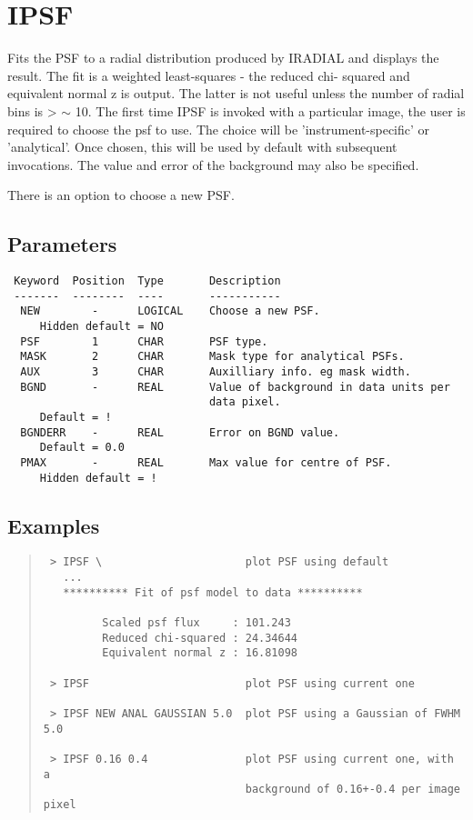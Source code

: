 \documentclass{book}
\renewcommand{\_}{{\tt\char'137}}     %
\begin{document}
\section{IPSF}
Fits the PSF to a radial distribution produced by IRADIAL and displays
the result. The fit is a weighted least-squares - the reduced chi-
squared and equivalent normal z is output. The latter is not useful
unless the number of radial bins is > $\sim$ 10. The first time IPSF is
invoked with a particular image, the user is required to choose the
psf to use. The choice will be 'instrument-specific' or 'analytical'.
Once chosen, this will be used by default with subsequent invocations.
The value and error of the background may also be specified.

There is an option to choose a new PSF.

\subsection{Parameters}
\begin{verbatim}
 Keyword  Position  Type       Description
 -------  --------  ----       -----------
  NEW        -      LOGICAL    Choose a new PSF.
     Hidden default = NO
  PSF        1      CHAR       PSF type.
  MASK       2      CHAR       Mask type for analytical PSFs.
  AUX        3      CHAR       Auxilliary info. eg mask width.
  BGND       -      REAL       Value of background in data units per
                               data pixel.
     Default = !
  BGNDERR    -      REAL       Error on BGND value.
     Default = 0.0
  PMAX       -      REAL       Max value for centre of PSF.
     Hidden default = !
\end{verbatim}\subsection{Examples}
\begin{quote}\begin{verbatim}
 > IPSF \                      plot PSF using default
   ...
   ********** Fit of psf model to data **********

         Scaled psf flux     : 101.243
         Reduced chi-squared : 24.34644
         Equivalent normal z : 16.81098

 > IPSF                        plot PSF using current one

 > IPSF NEW ANAL GAUSSIAN 5.0  plot PSF using a Gaussian of FWHM 5.0

 > IPSF 0.16 0.4               plot PSF using current one, with a
                               background of 0.16+-0.4 per image pixel
\end{verbatim}\end{quote}
\end{document}
